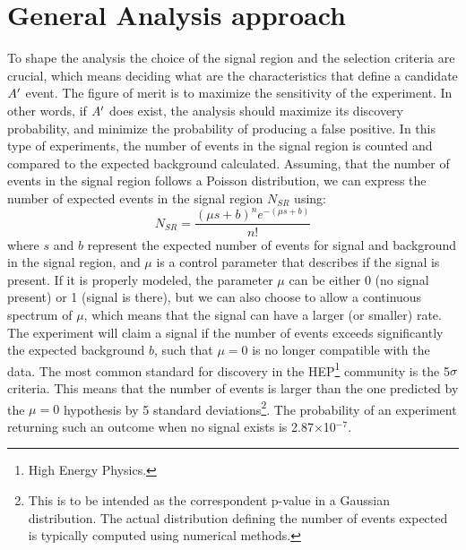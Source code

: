 \section{General Analysis approach}
\label{ch3:sec:analysis-approach}

To shape the analysis the choice of the signal region and the selection criteria are crucial, which means deciding what are the characteristics that define a candidate $A'$ event.
The figure of merit is to maximize the sensitivity of the experiment. In other words, if $A'$ does exist, the analysis should maximize its discovery probability, and minimize the probability of producing a false positive. In this type of experiments, the number of events in the signal region is counted and compared to the expected background calculated. Assuming, that the number of events in the signal region follows a Poisson distribution, we can express the number of expected events in the signal region $N_{SR}$ using:
\begin{equation}
  \label{eq:poisson-simple}
  N_{SR} = \frac{(\mu s + b)^ne^{-(\mu s + b)}}{n!}
\end{equation}
where $s$ and $b$ represent the expected number of events for signal and background in the signal region, and $\mu$ is a control parameter that describes if the signal is present. If it is properly modeled, the parameter $\mu$ can be either 0 (no signal present) or 1 (signal is there), but we can also choose to allow a continuous spectrum of $\mu$, which means that the signal can have a larger (or smaller) rate. The experiment will claim a signal if the number of events exceeds significantly the expected background $b$, such that $\mu = 0$ is no longer compatible with the data. The most common standard for discovery in the HEP\footnote{High Energy Physics.} community is the 5$\sigma$ criteria. This means that the number of events is larger than the one predicted by the $\mu = 0$ hypothesis by 5 standard deviations\footnote{This is to be intended as the correspondent p-value in a Gaussian distribution. The actual distribution defining the number of events expected is typically computed using numerical methods.}. The probability of an experiment returning such an outcome when no signal exists is 2.87$\times$10$^{-7}$.

